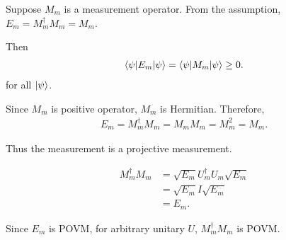 




Suppose $M_m$ is a measurement operator.
From the assumption, $E_m = M_m^\dagger M_m = M_m$.

Then
\begin{align*}
    \braket{\psi | E_m | \psi} = \braket{\psi | M_m | \psi} \geq 0.
\end{align*}
for all $\ket{\psi}$.

Since $M_m$ is positive operator, $M_m$ is Hermitian.
Therefore,
\begin{align*}
    E_m = M_m^\dagger M_m = M_m M_m = M_m^2 = M_m.
\end{align*}

Thus the measurement is a projective measurement.



\begin{align*}
    M_m^\dagger M_m &= \sqrt{E_m} U_m^\dagger U_m \sqrt{E_m}\\
        &= \sqrt{E_m} I \sqrt{E_m}\\
        &= E_m.
\end{align*}

Since $E_m$ is POVM,  for arbitrary  unitary $U$, $M_m^\dagger M_m$ is POVM.



